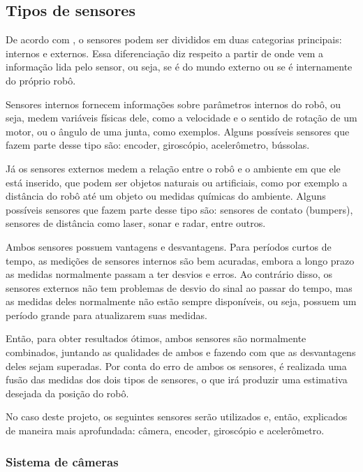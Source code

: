 \documentclass[acronym, symbols]{fei}
\begin{document}
		\subsection{Tipos de sensores}
		
			De acordo com \textcite{sensorFusionKalmanFilter}, o sensores podem ser divididos em duas categorias principais: internos e externos. Essa diferenciação diz respeito a partir de onde vem a informação lida pelo sensor, ou seja, se é do mundo externo ou se é internamente do próprio robô.
			
			Sensores internos fornecem informações sobre parâmetros internos do robô, ou seja, medem variáveis físicas dele, como a velocidade e o sentido de rotação de um motor, ou o ângulo de uma junta, como exemplos. Alguns possíveis sensores que fazem parte desse tipo são: encoder, giroscópio, acelerômetro, bússolas.
			
			Já os sensores externos medem a relação entre o robô e o ambiente em que ele está inserido, que podem ser objetos naturais ou artificiais, como por exemplo a distância do robô até um objeto ou medidas químicas do ambiente. Alguns possíveis sensores que fazem parte desse tipo são: sensores de contato (bumpers), sensores de distância como laser, sonar e radar, entre outros.
			
			Ambos sensores possuem vantagens e desvantagens. Para períodos curtos de tempo, as medições de sensores internos são bem acuradas, embora a longo prazo as medidas normalmente passam a ter desvios e erros. Ao contrário disso, os sensores externos não tem problemas de desvio do sinal ao passar do tempo, mas as medidas deles normalmente não estão sempre disponíveis, ou seja, possuem um período grande para atualizarem suas medidas.
			
			Então, para obter resultados ótimos, ambos sensores são normalmente combinados, juntando as qualidades de ambos e fazendo com que as desvantagens deles sejam superadas. Por conta do erro de ambos os sensores, é realizada uma fusão das medidas dos dois tipos de sensores, o que irá produzir uma estimativa desejada da posição do robô.
			
			No caso deste projeto, os seguintes sensores serão utilizados e, então, explicados de maneira mais aprofundada: câmera, encoder, giroscópio e acelerômetro.
			
			\subsubsection{Sistema de câmeras}
			
\end{document}

